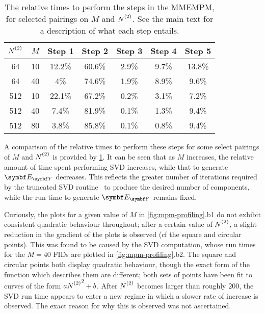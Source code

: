 \begin{table}
    \begin{center}
        \begin{tabular}{ c c c c c c c }
            \toprule
            $\Ntwo$ &
            $M$ &
            Step 1 &
            Step 2 &
            Step 3 &
            Step 4 &
            Step 5 \\
            \midrule
            64 & 10 & 12.2\% & 60.6\% & 2.9\% & 9.7\% & 13.8\% \\
            64 & 40 & 4\% & 74.6\% & 1.9\% & 8.9\% & 9.6\% \\
            512 & 10 & 22.1\% & 67.2\% & 0.2\% & 3.1\% & 7.2\% \\
            512 & 40 & 7.4\% & 81.9\% & 0.1\% & 1.3\% & 9.4\% \\
            512 & 80 & 3.8\% & 85.8\% & 0.1\% & 0.8\% & 9.4\% \\
            \bottomrule
        \end{tabular}
    \end{center}
    \caption[
        The relative times to perform the steps in the \acs{MMEMPM}.
    ]{
        The relative times to perform the steps in the
        \acs{MMEMPM}, for selected pairings on $M$ and $\Ntwo$. See the main
        text for a description of what each step entails.
    }
    \label{tab:mmempm-steps}
\end{table}
A comparison of the relative times to perform these steps for some select
pairings of $M$ and $\Ntwo$ is provided by \cref{tab:mmempm-steps}. It can be
seen that as $M$ increases, the relative amount of time spent performing
\ac{SVD} increases, while that to generate $\EY$ decreases. This
reflects the greater number of iterations required by
the truncated \ac{SVD} routine~\cite{svds} to produce the desired number of
components, while the run time to generate $\EY$ remains fixed.

Curiously, the plots for a given value of $M$ in
\cref{fig:mpm-profiling}.b1 do not exhibit
consistent quadratic behaviour throughout; after a certain value of $\Ntwo$, a
slight reduction in the gradient of the plots is observed (cf
the square and circular points). This was found to be caused by the \ac{SVD}
computation, whose run times for the $M=40$ \acp{FID} are plotted in
\cref{fig:mpm-profiling}.b2.
The square and circular points both display quadratic behaviour, though the
exact form of the function which
describes them are different; both sets of points have been fit to curves of
the form $a\Ntwo^2 + b$. After $\Ntwo$ becomes larger than
roughly $200$, the \ac{SVD} run time appears to enter a new regime in which
a slower rate of increase is observed. The exact reason for why this is
observed was not ascertained.

